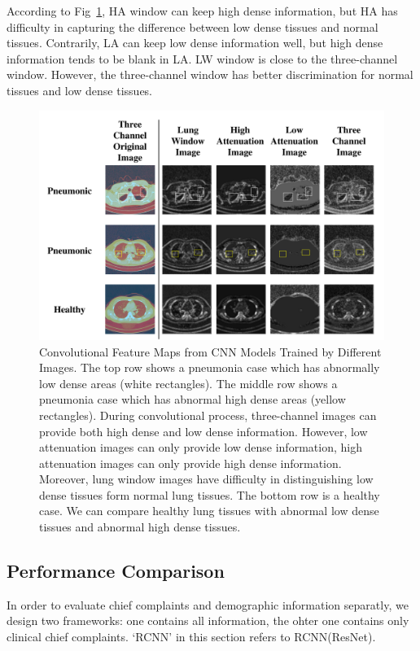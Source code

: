 \documentclass[journal]{IEEEtran}
\begin{document}
According to Fig~\ref{show}, HA window can keep high dense information, but HA has difficulty in capturing the difference between low dense tissues and normal tissues. Contrarily, LA can keep low dense information well, but high dense information tends to be blank in LA. LW window is close to the three-channel window. However, the three-channel window has better discrimination for normal tissues and low dense tissues.
\begin{figure}[t]
    \centerline{\includegraphics[width=150mm]{show.pdf}}
    \vspace{-0cm}
    \caption{Convolutional Feature Maps from CNN Models Trained by Different Images. 
    The top row shows a pneumonia case which has abnormally low dense areas (white rectangles). The middle row shows a pneumonia case which has abnormal high dense areas (yellow rectangles). During convolutional process, three-channel images can provide both high dense and low dense information. However, low attenuation images can only provide low dense information, high attenuation images can only provide high dense information. Moreover, lung window images have difficulty in distinguishing low dense tissues form normal lung tissues.
    The bottom row is a healthy case. We can compare healthy lung tissues with abnormal low dense tissues and abnormal high dense tissues.
    }
    \vspace{-0cm}
    \label{show}
    \end{figure}


\subsection{Performance Comparison}
In order to evaluate chief complaints and demographic information separatly, we design two frameworks: one contains all information, the ohter one contains only clinical chief complaints. `RCNN' in this section refers to RCNN(ResNet). 
\end{document}
